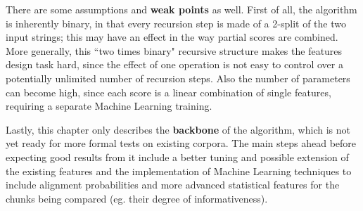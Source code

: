 There are some assumptions and \textbf{weak points} as well. First of all, the algorithm is inherently binary, in that every recursion step is made of a 2-split of the two input strings; this may have an effect in the way partial scores are combined. More generally, this ``two times binary" recursive structure makes the features design task hard, since the effect of one operation is not easy to control over a potentially unlimited number of recursion steps. Also the number of parameters can become high, since each score is a linear combination of single features, requiring a separate Machine Learning training.

Lastly, this chapter only describes the \textbf{backbone} of the algorithm, which is not yet ready for more formal tests on existing corpora. The main steps ahead before expecting good results from it include a better tuning and possible extension of the existing features  and the implementation of Machine Learning techniques to include alignment probabilities and more advanced statistical features for the chunks being compared (eg. their degree of informativeness).





